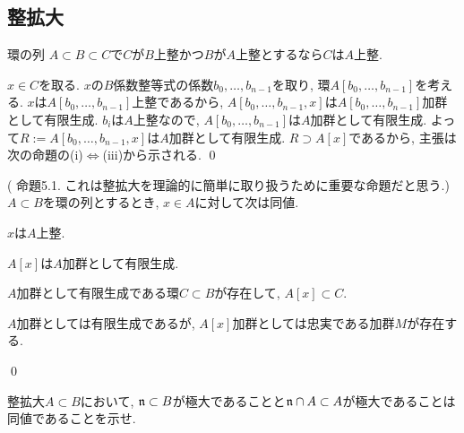 \subsection{整拡大}
\begin{prop}
環の列
$A\subset B\subset C$で$C$が$B$上整かつ$B$が$A$上整とするなら$C$は$A$上整.
\end{prop}
\prf
$x\in C$を取る. $x$の$B$係数整等式の係数$b_0,\dots, b_{n-1}$を取り, 環$A[b_0,\dots, b_{n-1}]$を考える. $x$は$A[b_0,\dots, b_{n-1}]$上整であるから, $A[b_0,\dots, b_{n-1},x]$は$A[b_0,\dots,b_{n-1}]$加群として有限生成. $b_{i}$は$A$上整なので, $A[b_0,\dots, b_{n-1}]$は$A$加群として有限生成. よって$R:=A[b_0,\dots, b_{n-1},x]$は$A$加群として有限生成. $R\supset A[x]$であるから, 主張は次の命題の(i)$\iff$(iii)から示される. \qed
\begin{prop} (\cite{atimac} 命題5.1. これは整拡大を理論的に簡単に取り扱うために重要な命題だと思う.) $A\subset B$を環の列とするとき, $x\in A$に対して次は同値.
\ben
\item $x$は$A$上整.
\item $A[x]$は$A$加群として有限生成.
\item $A$加群として有限生成である環$C\subset B$が存在して, $A[x]\subset C$.
\item $A$加群としては有限生成であるが, $A[x]$加群としては忠実である加群$M$が存在する.
\een
\end{prop}
\qed




\begin{prac} \label{prac:closedpoint_correspondence}
整拡大$A\subset B$において, $\mathfrak{n}\subset B$が極大であることと$\mathfrak{n}\cap A\subset A$が極大であることは同値であることを示せ.
\end{prac}

